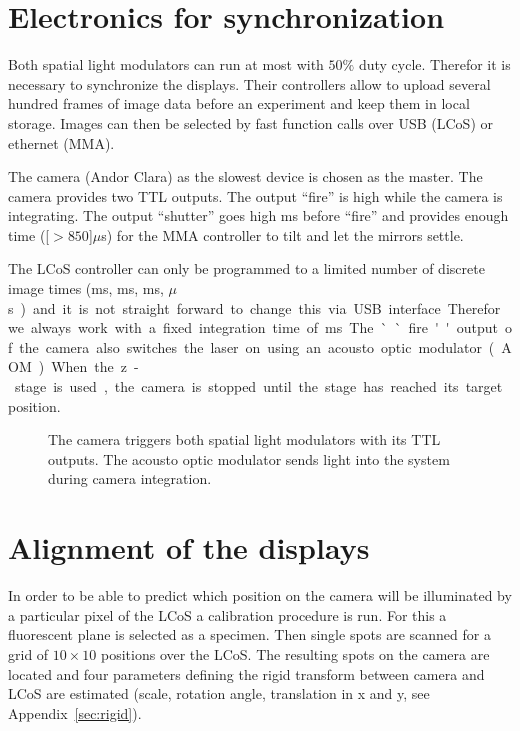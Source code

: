 \section{Electronics for synchronization}
Both spatial light modulators can run at most with $50\%$ duty
cycle. Therefor it is necessary to synchronize the displays. Their
controllers allow to upload several hundred frames of image data
before an experiment and keep them in local storage. Images can then
be selected by fast function calls over USB (LCoS) or ethernet (MMA).

The camera (Andor Clara) as the slowest device is chosen as the
master. The camera provides two TTL outputs. The output ``fire'' is
high while the camera is integrating. The output ``shutter'' goes high
\unit[1]{ms} before ``fire'' and provides enough time
(\unit[$>850$]{$\mu$s}) for the MMA controller to tilt and let the
mirrors settle.

The LCoS controller can only be programmed to a limited number of
discrete image times (\unit[20]{ms}, \unit[10]{ms}, \unit[5]{ms},
\unit[200]{$\mu$s}) and it is not straight forward to change this via
USB interface. Therefor we always work with a fixed integration time
of \unit[20]{ms}. The ``fire'' output of the camera also switches the
laser on using an acousto optic modulator (AOM).

When the z-stage is used, the camera is stopped until the stage has
reached its target position.

\begin{figure}[!hbt]
  \centering
  
  \caption{The camera triggers both spatial light modulators with its
    TTL outputs. The acousto optic modulator sends light into the
    system during camera integration.}
  \label{fig:memi-electronics}
\end{figure}

\section{Alignment of the displays}

In order to be able to predict which position on the camera will be
illuminated by a particular pixel of the LCoS a calibration procedure
is run. For this a fluorescent plane is selected as a specimen. Then
single spots are scanned for a grid of $10\times10$ positions over the
LCoS. The resulting spots on the camera are located and four
parameters defining the rigid transform between camera and LCoS are
estimated (scale, rotation angle, translation in x and y, see
Appendix~\ref{sec:rigid}).


